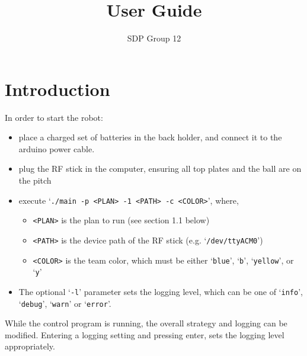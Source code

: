 \documentclass[12pt,a4paper]{article}
\author{SDP Group 12}
\title{User Guide}
\begin{document}
\maketitle




\section{Introduction}

In order to start the robot: 

\begin{itemize}
    \item place a charged set of batteries in the back holder, and connect it to the arduino power cable.
    \item plug the RF stick in the computer, ensuring all top plates and the ball are on the pitch
    \item execute `\texttt{./main -p <PLAN> -1 <PATH> -c <COLOR>}', where,
    \begin{itemize}
	\item \texttt{<PLAN>} is the plan to run (see section 1.1 below)
	\item \texttt{<PATH>} is the device path of the RF stick (e.g. `\verb$/dev/ttyACM0$')
	\item \texttt{<COLOR>} is the team color, which must be either `\texttt{blue}', `\texttt{b}', `\texttt{yellow}', or `\texttt{y}'
    \end{itemize}
    \item The optional `\texttt{-l}' parameter sets the logging level, which can be one of `\texttt{info}', `\texttt{debug}', `\texttt{warn}' or `\texttt{error}'.
\end{itemize}

While the control program is running, the overall strategy and logging can be modified. 
Entering a logging setting and pressing enter, sets the logging level appropriately.
\end{document}
